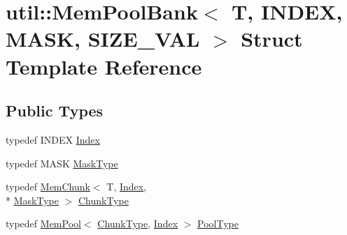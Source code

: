 \hypertarget{structutil_1_1MemPoolBank}{\section{util\-:\-:Mem\-Pool\-Bank$<$ T, I\-N\-D\-E\-X, M\-A\-S\-K, S\-I\-Z\-E\-\_\-\-V\-A\-L $>$ Struct Template Reference}
\label{structutil_1_1MemPoolBank}
}
\subsection*{Public Types}
\begin{DoxyCompactItemize}
\item 
typedef I\-N\-D\-E\-X \hyperlink{structutil_1_1MemPoolBank_a1acaedbb0b2b5d18faa451597e54d61d}{Index}
\item 
typedef M\-A\-S\-K \hyperlink{structutil_1_1MemPoolBank_aef12a55d338543b98354e53c5137e7ed}{Mask\-Type}
\item 
typedef \hyperlink{structutil_1_1MemChunk}{Mem\-Chunk}$<$ T, \hyperlink{structutil_1_1MemPoolBank_a1acaedbb0b2b5d18faa451597e54d61d}{Index}, \\*
\hyperlink{structutil_1_1MemPoolBank_aef12a55d338543b98354e53c5137e7ed}{Mask\-Type} $>$ \hyperlink{structutil_1_1MemPoolBank_ae0486bc8380e8aea5a8413e20ae31701}{Chunk\-Type}
\item 
typedef \hyperlink{structutil_1_1MemPool}{Mem\-Pool}$<$ \hyperlink{structutil_1_1MemPoolBank_ae0486bc8380e8aea5a8413e20ae31701}{Chunk\-Type}, \hyperlink{structutil_1_1MemPoolBank_a1acaedbb0b2b5d18faa451597e54d61d}{Index} $>$ \hyperlink{structutil_1_1MemPoolBank_aedc2fc3adbebd6cba13f64058ac208f8}{Pool\-Type}
\end{DoxyCompactItemize}
